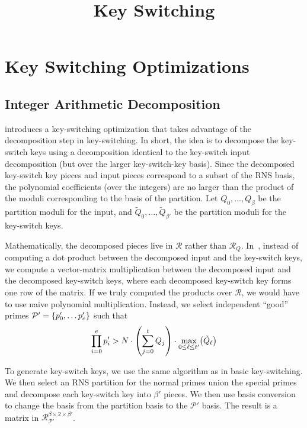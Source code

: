 \documentclass[../../fheimpl.tex]{subfiles}
\begin{document}
	\ifcompileasbook
	\else
	\title{Key Switching}
	\hypersetup{pageanchor=false}
	\maketitle
	\listoffixmes
	\tableofcontents
	\compileasbooktrue
	\hypersetup{pageanchor=true}
	\fi
	
	\section{Key Switching Optimizations}
	
	\subsection{Integer Arithmetic Decomposition}
	\cite{cryptoeprint:2023/413} introduces a key-switching optimization that takes advantage of the decomposition step in key-switching. In short, the idea is to decompose the key-switch keys using a decomposition identical to the key-switch input decomposition (but over the larger key-switch-key basis). Since the decomposed key-switch key pieces and input pieces correspond to a subset of the RNS basis, the polynomial coefficients (over the integers) are no larger than the product of the moduli corresponding to the basis of the partition. Let $Q_0, \ldots, Q_\beta$ be the partition moduli for the input, and $\tilde{Q}_0, \ldots, \tilde{Q}_{\beta'}$ be the partition moduli for the key-switch keys.
	
	Mathematically, the decomposed pieces live in $\mathcal{R}$ rather than $\mathcal{R}_Q$. In~\cite{cryptoeprint:2023/413}, instead of computing a dot product between the decomposed input and the key-switch keys, we compute a vector-matrix multiplication between the decomposed input and the decomposed key-switch keys, where each decomposed key-switch key forms one row of the matrix. If we truly computed the products over $\mathcal{R}$, we would have to use naive polynomial multiplication. Instead, we select independent ``good'' primes $\mathcal{P}'=\{p'_0, \ldots p'_e\}$ such that 
	\[\prod_{i=0}^e p'_i > N\cdot \parens*{\sum_{j=0}^t Q_j} \cdot \max_{0\le \ell\le t'}\parens*{\tilde{Q}_\ell}\]
	
	To generate key-switch keys, we use the same algorithm as in basic key-switching. We then select an RNS partition for the normal primes union the special primes and decompose each key-switch key into $\beta'$ pieces. We then use basis conversion to change the basis from the partition basis to the $\mathcal{P}'$ basis. The result is a matrix in $\mathcal{R}_{\mathcal{P}'}^{\beta\times 2\times \beta'}$.
	
\end{document}
